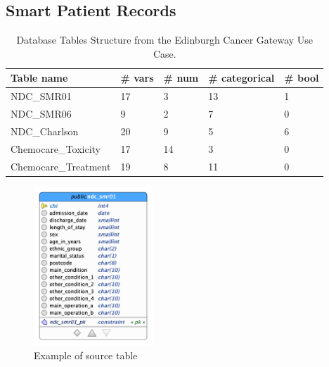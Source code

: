 
\subsection{Smart Patient Records}
\label{sec:smartPatientRecords}

\begin{table}[h!]
    \centering
    \begin{tabular}{|l|l|l|l|l|}
            \hline \hline
        \textbf{Table name} & \textbf{\# vars} & \textbf{\# num} & \textbf{\# categorical} & \textbf{\# bool} \\
        \hline 
        NDC\_SMR01 & 17 & 3 & 13 & 1 \\
        NDC\_SMR06 & 9 & 2 & 7 & 0 \\
        NDC\_Charlson & 20 & 9 & 5 & 6 \\
        Chemocare\_Toxicity & 17 & 14 & 3 & 0 \\
        Chemocare\_Treatment & 19 & 8 & 11 & 0 \\
        \hline \hline
            \end{tabular}
    \caption{Database Tables Structure from the Edinburgh Cancer Gateway Use Case.}
    \label{tab:useCaseData}
\end{table}

\begin{figure}
    \centering
    \includegraphics[width=45mm]{images/DataVault/smr01_source.png}
    \caption{Example of source table}
    \label{fig:smr01_source}
\end{figure}



